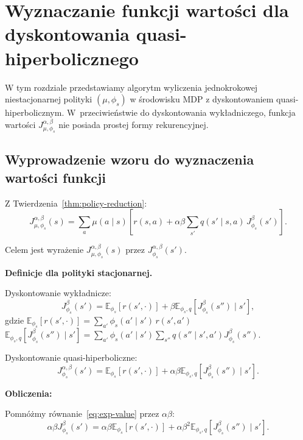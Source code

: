 \section{Wyznaczanie funkcji wartości dla dyskontowania quasi-hiperbolicznego}
W tym rozdziale przedstawiamy algorytm wyliczenia jednokrokowej niestacjonarnej polityki $(\mu, \phi_s)$ w środowisku MDP z dyskontowaniem quasi-hiperbolicznym. W~przeciwieństwie do dyskontowania wykładniczego, funkcja wartości $J_{\mu, \phi_s}^{\alpha, \beta}$ nie posiada prostej formy rekurencyjnej.
\subsection{Wyprowadzenie wzoru do wyznaczenia wartości funkcji}

Z Twierdzenia~\ref{thm:policy-reduction}:
\begin{equation}
J^{\alpha, \beta}_{\mu, \phi_s}(s) = \sum_a \mu(a\mid s) \left[ r(s, a) + \alpha\beta \sum_{s'} q(s'\mid s, a) \, J^{\beta}_{\phi_s}(s') \right].
\label{eq:policy-eval-start}
\end{equation}

Celem jest wyrażenie   $J^{\alpha, \beta}_{\mu, \phi_s}(s)$ przez $J^{\alpha, \beta}_{\phi_s}(s')$.
\par\noindent\textbf{Definicje dla polityki stacjonarnej.}\par

Dyskontowanie wykładnicze:
\begin{equation}
J^{\beta}_{\phi_s}(s') = \mathbb{E}_{\phi_s} [r(s', \cdot)] + \beta \mathbb{E}_{\phi_s, q} [J^{\beta}_{\phi_s}(s'') \mid s'],
\label{eq:exp-value}
\end{equation}
 gdzie $\mathbb{E}_{\phi_s} [r(s', \cdot)] = \sum_{a'} \phi_s(a'\mid s') \, r(s', a')$ \\ $\mathbb{E}_{\phi_s,q}[J^{\beta}_{\phi_s}(s'')\mid s'] = \sum_{a'} \phi_s(a'\mid s') \sum_{s''} q(s''\mid s', a') J^{\beta}_{\phi_s}(s'')$.

Dyskontowanie quasi-hiperboliczne:
\begin{equation}
J^{\alpha, \beta}_{\phi_s}(s') = \mathbb{E}_{\phi_s} [r(s', \cdot)] + \alpha \beta \mathbb{E}_{\phi_s, q} [J^{\beta}_{\phi_s}(s'') \mid s'].
\label{eq:qh-value-stat}
\end{equation}

\par\noindent\textbf{Obliczenia:}\par

Pomnóżmy równanie~\eqref{eq:exp-value} przez $\alpha \beta$:
\begin{equation}
\alpha \beta J^{\beta}_{\phi_s}(s') = \alpha \beta \mathbb{E}_{\phi_s} [r(s', \cdot)] + \alpha \beta^2 \mathbb{E}_{\phi_s, q} [J^{\beta}_{\phi_s}(s'') \mid s'].
\label{eq:mult-ab}
\end{equation}

